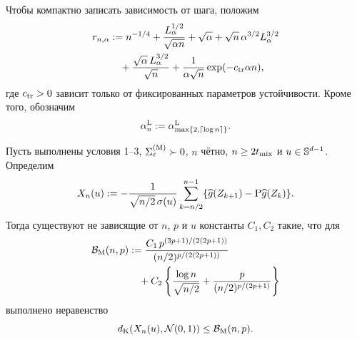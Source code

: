 Чтобы компактно записать зависимость от шага, положим
\begin{align}\label{eq:alpha-n-rate}
 r_{n,\alpha}
 &: =n^{-1/4}
 +\frac{L_\alpha^{1/2}}{\sqrt{\alpha n}}
 +\sqrt\alpha
 +\sqrt n\,\alpha^{3/2}L_\alpha^{3/2}\notag\\
 &\quad
 +\frac{\sqrt\alpha\,L_\alpha^{3/2}}{\sqrt n}
 +\frac1{\alpha\sqrt n}\exp(-c_{\rm tr}\alpha n),
\end{align}
где $c_{\rm tr}>0$ зависит только от фиксированных параметров устойчивости.
Кроме того, обозначим
\[
 \alpha_n^{\rm L}:=
 \alpha_{\max\{2,\left\lceil \log n \right\rceil\}}^{\rm L}.
\]

\begin{lemma}
\label{lem:martingale-gaussian}
Пусть выполнены условия 1--3, $\Sigma^{(\mathrm{M})}_\varepsilon\succ0$, $n$ чётно,
$n\geq2t_{\operatorname{mix}}$ и $u\in\mathbb{S}^{d-1}$. Определим
\begin{equation}\label{eq:martingale-part}
 X_n(u):=-\frac1{\sqrt{n/2}\,\sigma(u)}
 \sum_{k=n/2}^{n-1}
 \{\widehat g(Z_{k+1})-\mathrm{P}\widehat g(Z_k)\}.
\end{equation}
Тогда существуют не зависящие от $n$, $p$ и $u$ константы $C_1,C_2$ такие,
что для
\begin{align}\label{eq:BM-definition}
 \mathcal B_{\rm M}(n,p)
 &:=\frac{C_1\,
 p^{(3p+1)/(2(2p+1))}}
 {(n/2)^{p/(2(2p+1))}}\notag\\
 &\quad+C_2\left\{
 \frac{\log n}{\sqrt{n/2}}
 +\frac{p}{(n/2)^{p/(2p+1)}}\right\}
\end{align}
выполнено неравенство
\begin{equation}\label{eq:additive-gaussian}
 d_{\mathrm K}\!\left(X_n(u),\mathcal{N}(0,1)\right)
 \leq\mathcal B_{\rm M}(n,p).
\end{equation}
\end{lemma}

